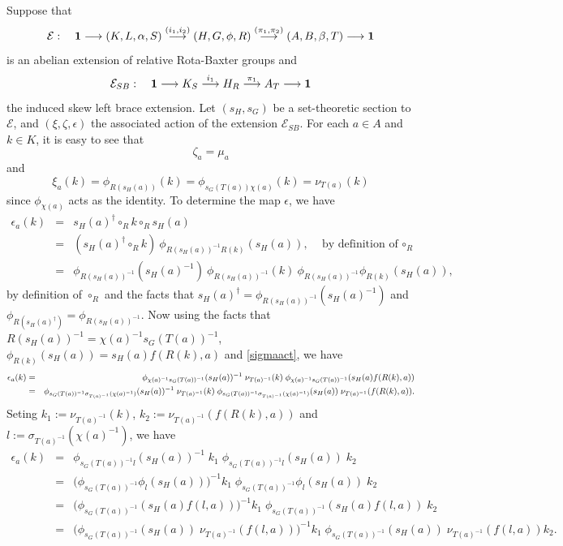 \documentclass[11pt]{amsart}
\theoremstyle{thrm}
\theoremstyle{plain}
\theoremstyle{definition}
\numberwithin{equation}{section}
\begin{document}
Suppose that 
\begin{equation*}
\mathcal{E} : \quad {\bf 1} \longrightarrow (K,L,\alpha,S ) \stackrel{(i_1, i_2)}{\longrightarrow}  (H,G, \phi, R) \stackrel{(\pi_1, \pi_2)}{\longrightarrow} (A,B, \beta, T) \longrightarrow {\bf 1}
\end{equation*}
 is an abelian extension of relative Rota-Baxter groups and 
\begin{equation*}
\mathcal{E}_{SB}: \quad  {\bf 1} \longrightarrow K_{S} \stackrel{i_1}{\longrightarrow}  H_{R} \stackrel{\pi_1}{\longrightarrow} A_{T} \longrightarrow {\bf 1}
\end{equation*}
 the induced skew left brace extension. Let $(s_H, s_G)$ be a set-theoretic section to $\mathcal{E}$, and  $(\xi, \zeta, \epsilon)$ the associated action of the extension $\mathcal{E}_{SB}$. For each $a \in A$ and $k \in K$, it is easy to see that  $$\zeta_a= \mu_a$$ and 
$$\xi_a(k)= \phi_{R(s_H(a))}(k)=\phi_{s_G(T(a))\chi(a)}(k)=\nu_{T(a)}(k)$$ 
since $\phi_{\chi(a)}$ acts as the identity.  To determine the map $\epsilon$, we have
	\begin{eqnarray*}
		\epsilon_a(k) &=& s_H(a)^{\dagger} \circ_R k \circ_R s_H(a)\\
		&=& (s_H(a)^{\dagger} \circ_R k)~ \phi_{R(s_H(a))^{-1} R(k)}(s_H(a)), \quad \textrm{by definition of $\circ_R$}\\
		&=& \phi_{R(s_H(a))^{-1}} (s_H(a)^{-1})~ \phi_{R(s_H(a))^{-1}}(k) ~\phi_{R(s_H(a))^{-1}} \phi_{ R(k)}(s_H(a)),
	\end{eqnarray*}
by definition of $\circ_R$ and the facts that $s_H(a)^{\dagger}=\phi_{R(s_H(a))^{-1}} (s_H(a)^{-1})$ and $\phi_{R(s_H(a)^{\dagger})}=\phi_{R(s_H(a))^{-1}}$. Now using the facts that $R(s_H(a))^{-1}= \chi(a)^{-1} s_G(T(a))^{-1}$, $\phi_{ R(k)}(s_H(a))=s_H(a)f(R(k), a)$ and \eqref{sigmaact},  we have 
	\begin{eqnarray*}
		\epsilon_a(k) &=& \phi_{\chi(a)^{-1} s_G(T(a))^{-1}} (s_H(a))^{-1} \;  \nu_{T(a)^{-1}}(k) \; \phi_{\chi(a)^{-1} s_G(T(a))^{-1}}(s_H(a) f(R(k), a))\notag \\
		&=&  \phi_{s_G(T(a))^{-1} \sigma_{T(a)^{-1}}(\chi(a)^{-1})} (s_H(a))^{-1}\; \nu_{T(a)^{-1}}(k) \; \phi_{ s_G(T(a))^{-1} \sigma_{T(a)^{-1}}(\chi(a)^{-1})}(s_H(a)) \; \nu_{T(a)^{-1}}(f(R(k), a)).
	\end{eqnarray*}
	Seting $k_1:= \nu_{T(a)^{-1}}(k)$, $k_2:= \nu_{T(a)^{-1}}(f(R(k), a))$ and $l:= \sigma_{T(a)^{-1}}(\chi(a)^{-1})$,  we have
	\begin{eqnarray*}
		\epsilon_a(k) &=&  \phi_{s_G(T(a))^{-1} l} (s_H(a))^{-1} \; k_1 \; \phi_{ s_G(T(a))^{-1} l}(s_H(a)) \; k_2  \\
		&=&  \big(\phi_{s_G(T(a))^{-1}} \phi_l (s_H(a)) \big)^{-1} k_1 \; \phi_{s_G(T(a))^{-1}} \phi_l (s_H(a)) \; k_2 \\
		&=&  \big(\phi_{s_G(T(a))^{-1}} (s_H(a)f(l, a))\big)^{-1} k_1 \; \phi_{s_G(T(a))^{-1}} (s_H(a)f(l, a)) \; k_2\\
		&=& \big(\phi_{s_G(T(a))^{-1}} (s_H(a))\; \nu_{T(a)^{-1}}(f(l,a))\big)^{-1} k_1 \; \phi_{s_G(T(a))^{-1}} (s_H(a))\; \nu_{T(a)^{-1}}(f(l,a)) k_2.
	\end{eqnarray*}
\end{document}
